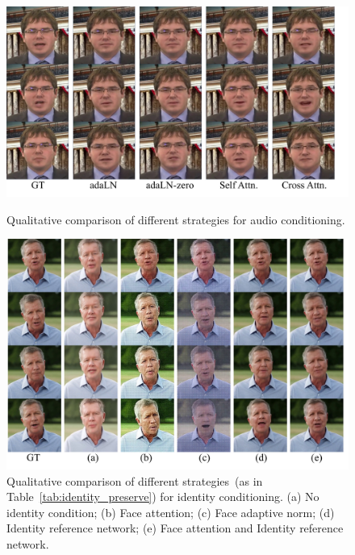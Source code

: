 \begin{figure}[!t]
    \centering
    \begin{minipage}{0.48\linewidth}
        \centering
        \includegraphics[width=\linewidth]{figs/comparisn_of_audio_conditioning3.pdf}
        \vspace{-7mm}
        \caption{Qualitative comparison of different strategies for audio conditioning.}
        \label{fig:comparisn_of_audio_conditioning2}
        \vspace{16.5mm}
    \end{minipage}
    \hfill%
    \begin{minipage}{0.48\linewidth}
        \centering
        \includegraphics[width=1\linewidth]{figs/Comparison_of_the_appearance_reference_network2.pdf}
        \vspace{-7mm}
        \caption{Qualitative comparison of different strategies~(as in Table~\ref{tab:identity_preserve}) for identity conditioning. 
        (a) No identity condition; (b) Face attention; (c) Face adaptive norm; (d) Identity reference network; (e) Face attention and Identity reference network. 
        }
        \label{fig:Comparison_of_the_appearance_reference_network}
    \end{minipage}
    \vspace{-3mm}
\end{figure}




